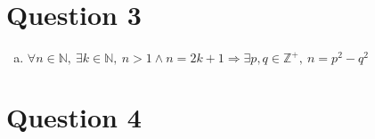 \documentclass[12pt]{article}
\begin{document}
\section*{Question 3}
\begin{enumerate}[a.]
    \item

    $\forall n \in \mathbb{N},\:\exists k \in \mathbb{N},\:n > 1 \land n = 2k + 1 \Rightarrow
    \exists p,q \in \mathbb{Z}^{+},\:n = p^2 - q^2$

\end{enumerate}


\section*{Question 4}
\end{document}
